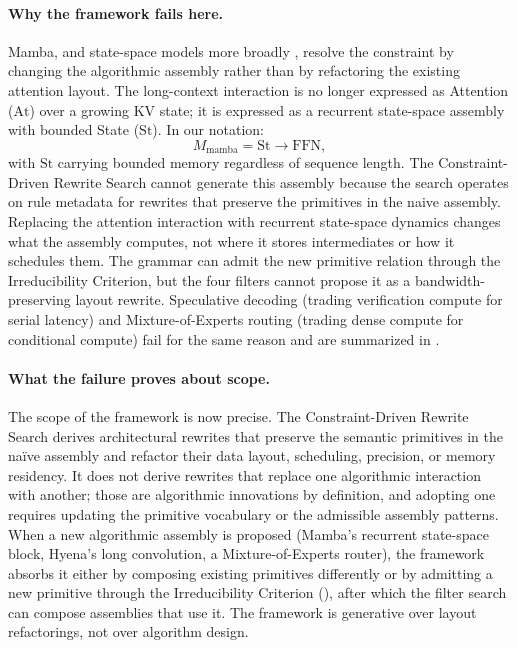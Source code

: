 \documentclass[10pt,twocolumn]{article}
\begin{document}
\paragraph{Why the framework fails here.} Mamba, and state-space models more broadly \citep{gu2023mamba}, resolve the constraint by changing the algorithmic assembly rather than by refactoring the existing attention layout. The long-context interaction is no longer expressed as Attention ($\text{At}$) over a growing KV state; it is expressed as a recurrent state-space assembly with bounded State ($\text{St}$). In our notation:
\begin{equation*}
M_{\text{mamba}} = \text{St} \rightarrow \text{FFN},
\end{equation*}
with $\text{St}$ carrying bounded memory regardless of sequence length. The Constraint-Driven Rewrite Search cannot generate this assembly because the search operates on rule metadata for rewrites that preserve the primitives in the naive assembly. Replacing the attention interaction with recurrent state-space dynamics changes what the assembly computes, not where it stores intermediates or how it schedules them. The grammar can admit the new primitive relation through the Irreducibility Criterion, but the four filters cannot propose it as a bandwidth-preserving layout rewrite. Speculative decoding (trading verification compute for serial latency) and Mixture-of-Experts routing (trading dense compute for conditional compute) fail for the same reason and are summarized in .

\paragraph{What the failure proves about scope.} The scope of the framework is now precise. The Constraint-Driven Rewrite Search derives architectural rewrites that preserve the semantic primitives in the na\"ive assembly and refactor their data layout, scheduling, precision, or memory residency. It does not derive rewrites that replace one algorithmic interaction with another; those are algorithmic innovations by definition, and adopting one requires updating the primitive vocabulary or the admissible assembly patterns. When a new algorithmic assembly is proposed (Mamba's recurrent state-space block, Hyena's long convolution, a Mixture-of-Experts router), the framework absorbs it either by composing existing primitives differently or by admitting a new primitive through the Irreducibility Criterion (), after which the filter search can compose assemblies that use it. The framework is generative over layout refactorings, not over algorithm design.
\end{document}
